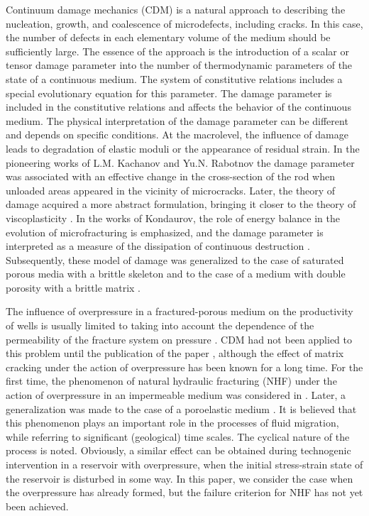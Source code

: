 \documentclass[article,authoryear,jpm]{beg_39}             %
\begin{document}
Continuum damage mechanics (CDM) is a natural approach to describing the nucleation, growth, and coalescence of microdefects, including cracks.
In this case, the number of defects in each elementary volume of the medium should be sufficiently large.
The essence of the approach is the introduction of a scalar or tensor damage parameter into the number of thermodynamic parameters of the state of a continuous medium.
The system of constitutive relations includes a special evolutionary equation for this parameter.
The damage parameter is included in the constitutive relations and affects the behavior of the continuous medium.
The physical interpretation of the damage parameter can be different and depends on specific conditions.
At the macrolevel, the influence of damage leads to degradation of elastic moduli or the appearance of residual strain.
In the pioneering works of L.M.
Kachanov and Yu.N.
Rabotnov the damage parameter was associated with an effective change in the cross-section of the rod when unloaded areas appeared in the vicinity of microcracks.
Later, the theory of damage acquired a more abstract formulation, bringing it closer to the theory of viscoplasticity \cite{Lemaitre, Murakami}.
In the works of Kondaurov, the role of energy balance in the evolution of microfracturing is emphasized, and the damage parameter is interpreted as a measure of the dissipation of continuous destruction \cite{Kondaurov2002}.
Subsequently, these model of damage was generalized to the case of saturated porous media with a brittle skeleton \cite{Izvekov} and to the case of a medium with double porosity with a brittle matrix \cite{Izvekov2020}.

The influence of overpressure in a fractured-porous medium on the productivity of wells is usually limited to taking into account the dependence of the permeability of the fracture system on pressure \cite{Thompson}.
CDM had not been applied to this problem until the publication of the paper \cite{Izvekov2020}, although the effect of matrix cracking under the action of overpressure has been known for a long time.
For the first time, the phenomenon of natural hydraulic fracturing (NHF) under the action of overpressure in an impermeable medium was considered in \cite{Secor}.
Later, a generalization was made to the case of a poroelastic medium \cite{Engelder, Luo}.
It is believed that this phenomenon plays an important role in the processes of fluid migration, while referring to significant (geological) time scales.
The cyclical nature of the process is noted.
Obviously, a similar effect can be obtained during technogenic intervention in a reservoir with overpressure, when the initial stress-strain state of the reservoir is disturbed in some way.
In this paper, we consider the case when the overpressure has already formed, but the failure criterion for NHF has not yet been achieved.
\end{document}
